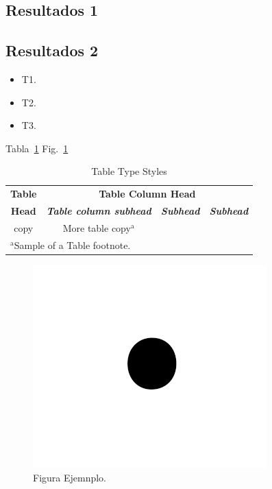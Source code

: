 \documentclass[conference]{IEEEtran}
\begin{document}
\subsection{Resultados 1}

\subsection{Resultados 2}

\begin{itemize}
    \item T1.
    \item T2.
    \item T3.
\end{itemize}

Tabla~\ref{tab:1}
Fig.~\ref{fig:1}

\begin{table}[htbp]
    \caption{Table Type Styles}
    \begin{center}
        \begin{tabular}{|c|c|c|c|}
            \hline
            \textbf{Table}            & \multicolumn{3}{|c|}{\textbf{Table
                    Column Head}}
            \\
            \cline{2-4}
            \textbf{Head}             & \textbf{\textit{Table column subhead}}
                                      &
            \textbf{\textit{Subhead}} & \textbf{\textit{Subhead}}
            \\
            \hline
            copy                      & More table copy$^{\mathrm{a}}$
                                      &
                                      &
            \\
            \hline
            \multicolumn{4}{l}{$^{\mathrm{a}}$Sample of a Table footnote.}
        \end{tabular}
        \label{tab:1}
    \end{center}
\end{table}

\begin{figure}[htbp]
    \centerline{\includegraphics{Figures/fig1.png}}
    \caption{Figura Ejemnplo.}
    \label{fig:1}
\end{figure}
\end{document}
